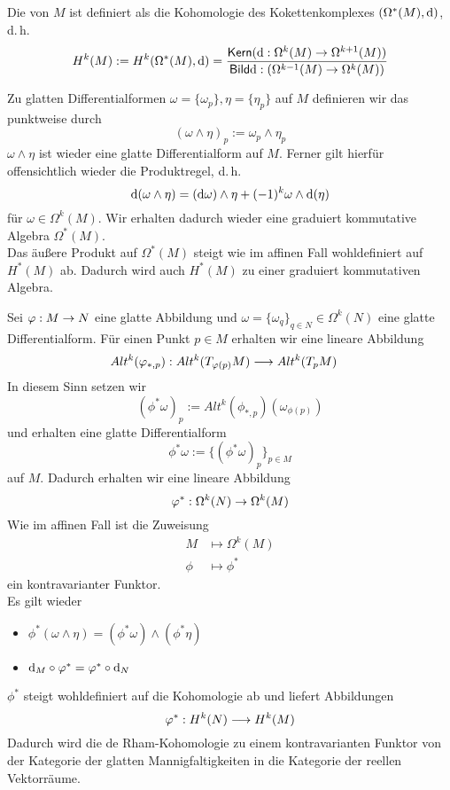 \Def{}
Die  von $M$ ist definiert als die Kohomologie des Kokettenkomplexes $(\Omega^*(M), \text{d})$, d.\,h.
\[ H^k(M) := H^k(\Omega^*(M), \text{d}) = \frac{\textsf{Kern} (\text{d} : \Omega^k(M) \overset{}{\rightarrow}\Omega^{k+1}(M))}{\textsf{Bild} \text{d} : (\Omega^{k-1}(M) \overset{}{\rightarrow} \Omega^k(M))} \]

\Def{}
Zu glatten Differentialformen $\omega = \{ \omega_p\}, \eta = \{\eta_p\}$ auf $M$ definieren wir das  punktweise durch
\[ (\omega\wedge \eta)_p := \omega_p \wedge \eta_p \]
$\omega \wedge \eta$ ist wieder eine glatte Differentialform auf $M$. Ferner gilt hierfür offensichtlich wieder die Produktregel, d.\,h.
\[ \text{d}(\omega \wedge \eta) = (\text{d} \omega) \wedge \eta + (-1)^k\omega \wedge \text{d}(\eta) \]
für $\omega \in \Omega^k(M)$. Wir erhalten dadurch wieder eine graduiert kommutative Algebra $\Omega^*(M)$.\\
Das äußere Produkt auf $\Omega^*(M)$ steigt wie im affinen Fall wohldefiniert auf $H^*(M)$ ab. Dadurch wird auch $H^*(M)$ zu einer graduiert kommutativen Algebra.

\Def{}
Sei $\varphi : M \overset{}{\rightarrow} N$ eine glatte Abbildung und $\omega = \{ \omega_q\}_{q\in N} \in \Omega^k(N)$ eine glatte Differentialform. Für einen Punkt $p \in M$ erhalten wir eine lineare Abbildung
\begin{align*}
Alt^k(\varphi_{*,p}) : Alt^k(T_{\varphi(p)}M) & \overset{}{\longrightarrow} Alt^k(T_pM)
\end{align*}
In diesem Sinn setzen wir
\[ (\phi^*\omega)_p := Alt^k(\phi_{*,p})(\omega_{\phi(p)}) \]
und erhalten eine glatte Differentialform
\[ \phi^*\omega := \{ (\phi^*\omega)_p\}_{p\in M} \]
auf $M$. Dadurch erhalten wir eine lineare Abbildung
\[ \varphi^* : \Omega^k(N) \overset{}{\rightarrow} \Omega^k(M) \]
Wie im affinen Fall ist die Zuweisung
\begin{align*}
M & \longmapsto \Omega^k(M)\\
\phi & \longmapsto \phi^*
\end{align*}
ein kontravarianter Funktor.\\
Es gilt wieder
\begin{itemize}
	\item $\phi^*(\omega \wedge \eta) = (\phi^*\omega) \wedge (\phi^*\eta)$
	\item $\text{d}_M \circ \varphi^* = \varphi^* \circ \text{d}_N$
\end{itemize}
$\phi^*$ steigt wohldefiniert auf die Kohomologie ab und liefert Abbildungen
\[ \varphi^* : H^k(N) \overset{}{\longrightarrow} H^k(M) \]
Dadurch wird die de Rham-Kohomologie zu einem kontravarianten Funktor von der Kategorie der glatten Mannigfaltigkeiten in die Kategorie der reellen Vektorräume.

